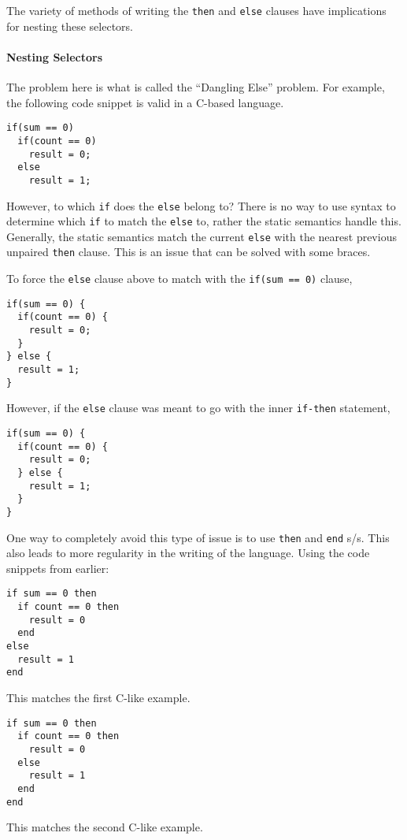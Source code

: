 The variety of methods of writing the \texttt{then} and \texttt{else} clauses have implications for nesting these selectors.

\paragraph{Nesting Selectors}\label{par:2_Way_Selection-Nesting}
The problem here is what is called the ``Dangling Else'' problem.
For example, the following code snippet is valid in a C-based language.
\begin{verbatim}
if(sum == 0)
  if(count == 0)
    result = 0;
  else
    result = 1;
\end{verbatim}

However, to which \texttt{if} does the \texttt{else} belong to?
There is no way to use syntax to determine which \texttt{if} to match the \texttt{else} to, rather the static semantics handle this.
Generally, the static semantics match the current \texttt{else} with the nearest previous unpaired \texttt{then} clause.
This is an issue that can be solved with some braces.

To force the \texttt{else} clause above to match with the \texttt{if(sum == 0)} clause,
\begin{verbatim}
if(sum == 0) {
  if(count == 0) {
    result = 0;
  }
} else {
  result = 1;
}
\end{verbatim}

However, if the \texttt{else} clause was meant to go with the inner \texttt{if-then} statement,
\begin{verbatim}
if(sum == 0) {
  if(count == 0) {
    result = 0;
  } else {
    result = 1;
  }
}
\end{verbatim}

One way to completely avoid this type of issue is to use \texttt{then} and \texttt{end} s/s.
This also leads to more regularity in the writing of the language.
Using the code snippets from earlier:
\begin{verbatim}
if sum == 0 then
  if count == 0 then
    result = 0
  end
else
  result = 1
end
\end{verbatim}
This matches the first C-like example.

\begin{verbatim}
if sum == 0 then
  if count == 0 then
    result = 0
  else
    result = 1
  end
end
\end{verbatim}
This matches the second C-like example.

